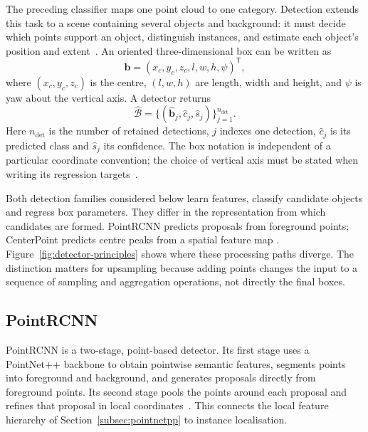 The preceding classifier maps one point cloud to one category. Detection
extends this task to a scene containing several objects and background:
it must decide which points support an object, distinguish instances, and
estimate each object's position and extent~\cite{shi2019pointrcnn}.
An oriented three-dimensional box can be written as
\begin{equation}
 \mathbf b=(x_c,y_c,z_c,l,w,h,\psi)^{\mathsf T},
 \label{eq:box}
\end{equation}
where $(x_c,y_c,z_c)$ is the centre, $(l,w,h)$ are length, width and height,
and $\psi$ is yaw about the vertical axis. A detector returns
\begin{equation}
 \hat{\mathcal B}=\{(\hat{\mathbf b}_j,\hat c_j,\hat s_j)\}_{j=1}^{n_\mathrm{det}}.
 \label{eq:detections}
\end{equation}
Here $n_\mathrm{det}$ is the number of retained detections, $j$ indexes one
detection, $\hat c_j$ is its predicted class and $\hat s_j$ its confidence.
The box notation is independent of a particular coordinate convention;
the choice of vertical axis must be stated when writing its regression
targets~\cite{shi2019pointrcnn}.

Both detection families considered below learn features, classify candidate
objects and regress box parameters. They differ in the representation from
which candidates are formed. PointRCNN predicts proposals from foreground
points; CenterPoint predicts centre peaks from a spatial feature map
\cite{shi2019pointrcnn,yin2021centerpoint}. Figure~\ref{fig:detector-principles}
shows where these processing paths diverge. The distinction matters for
upsampling because adding points changes the input to a sequence of
sampling and aggregation operations, not directly the final boxes.

\subsection{PointRCNN}
\label{subsec:pointrcnn}

PointRCNN is a two-stage, point-based detector. Its first stage uses a
PointNet++ backbone to obtain pointwise semantic features, segments points
into foreground and background, and generates proposals directly from
foreground points. Its second stage pools the points around each proposal
and refines that proposal in local coordinates~\cite{shi2019pointrcnn}.
This connects the local feature hierarchy of
Section~\ref{subsec:pointnetpp} to instance localisation.

